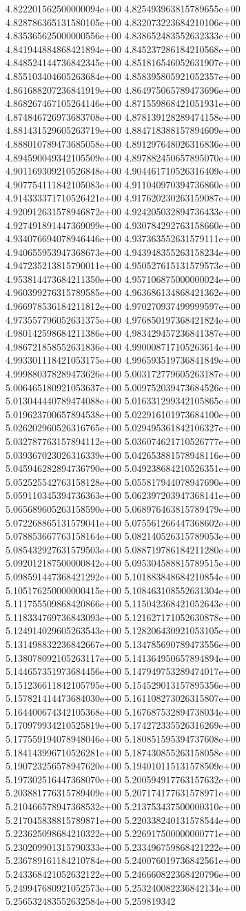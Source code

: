 4.822201562500000094e+00	4.825493963815789655e+00	4.828786365131580105e+00	4.832073223684210106e+00	4.835365625000000556e+00	4.838652483552632333e+00	4.841944884868421894e+00	4.845237286184210568e+00	4.848524144736842345e+00	4.851816546052631907e+00	4.855103404605263684e+00	4.858395805921052357e+00	4.861688207236841919e+00	4.864975065789473696e+00	4.868267467105264146e+00	4.871559868421051931e+00	4.874846726973683708e+00	4.878139128289474158e+00	4.881431529605263719e+00	4.884718388157894609e+00	4.888010789473685058e+00	4.891297648026316836e+00	4.894590049342105509e+00	4.897882450657895070e+00	4.901169309210526848e+00	4.904461710526316409e+00	4.907754111842105083e+00	4.911040970394736860e+00	4.914333371710526421e+00	4.917620230263159087e+00	4.920912631578946872e+00	4.924205032894736433e+00	4.927491891447369099e+00	4.930784292763158660e+00	4.934076694078946446e+00	4.937363552631579111e+00	4.940655953947368673e+00	4.943948355263158234e+00	4.947235213815790011e+00	4.950527615131579573e+00	4.953814473684211350e+00	4.957106875000000024e+00	4.960399276315789585e+00	4.963686134868421362e+00	4.966978536184211812e+00	4.970270937499999597e+00	4.973557796052631375e+00	4.976850197368421824e+00	4.980142598684211386e+00	4.983429457236841387e+00	4.986721858552631836e+00	4.990008717105263614e+00	4.993301118421053175e+00	4.996593519736841849e+00	4.999880378289473626e+00	5.003172779605263187e+00	5.006465180921053637e+00	5.009752039473684526e+00	5.013044440789474088e+00	5.016331299342105865e+00	5.019623700657894538e+00	5.022916101973684100e+00	5.026202960526316765e+00	5.029495361842106327e+00	5.032787763157894112e+00	5.036074621710526777e+00	5.039367023026316339e+00	5.042653881578948116e+00	5.045946282894736790e+00	5.049238684210526351e+00	5.052525542763158128e+00	5.055817944078947690e+00	5.059110345394736363e+00	5.062397203947368141e+00	5.065689605263158590e+00	5.068976463815789479e+00	5.072268865131579041e+00	5.075561266447368602e+00	5.078853667763158164e+00	5.082140526315789053e+00	5.085432927631579503e+00	5.088719786184211280e+00	5.092012187500000842e+00	5.095304588815789515e+00	5.098591447368421292e+00	5.101883848684210854e+00	5.105176250000000415e+00	5.108463108552631304e+00	5.111755509868420866e+00	5.115042368421052643e+00	5.118334769736843093e+00	5.121627171052630878e+00	5.124914029605263543e+00	5.128206430921053105e+00	5.131498832236842667e+00	5.134785690789473556e+00	5.138078092105263117e+00	5.141364950657894894e+00	5.144657351973684456e+00	5.147949753289474017e+00	5.151236611842105795e+00	5.154529013157895356e+00	5.157821414473684030e+00	5.161108273026315807e+00	5.164400674342105368e+00	5.167687532894738034e+00	5.170979934210525819e+00	5.174272335526316269e+00	5.177559194078948046e+00	5.180851595394737608e+00	5.184143996710526281e+00	5.187430855263158058e+00	5.190723256578947620e+00	5.194010115131578509e+00	5.197302516447368070e+00	5.200594917763157632e+00	5.203881776315789409e+00	5.207174177631578971e+00	5.210466578947368532e+00	5.213753437500000310e+00	5.217045838815789871e+00	5.220338240131578544e+00	5.223625098684210322e+00	5.226917500000000771e+00	5.230209901315790333e+00	5.233496759868421222e+00	5.236789161184210784e+00	5.240076019736842561e+00	5.243368421052632122e+00	5.246660822368420796e+00	5.249947680921052573e+00	5.253240082236842134e+00	5.256532483552632584e+00	5.259819342